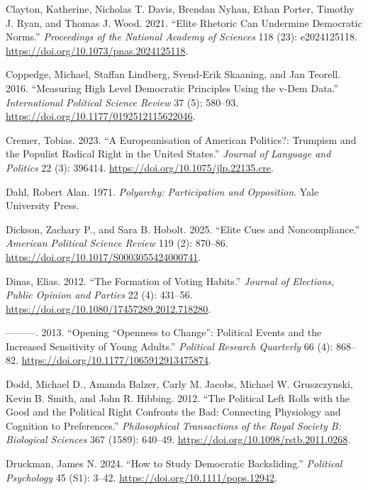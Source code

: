 \documentclass[
  10pt,
  letterpaper,
  DIV=11,
  numbers=noendperiod]{scrartcl}
\newlength{\cslhangindent}
\newenvironment{CSLReferences}[2] %
 {\begin{list}{}{%
  \setlength{\itemindent}{0pt}
  \setlength{\leftmargin}{0pt}
  \setlength{\parsep}{0pt}
  \ifodd #1
   \setlength{\leftmargin}{\cslhangindent}
   \setlength{\itemindent}{-1\cslhangindent}
  \fi
  \setlength{\itemsep}{#2\baselineskip}}}
 {\end{list}}
\begin{document}
\begin{CSLReferences}{1}{0}
Clayton, Katherine, Nicholas T. Davis, Brendan Nyhan, Ethan Porter,
Timothy J. Ryan, and Thomas J. Wood. 2021. {``Elite Rhetoric Can
Undermine Democratic Norms.''} \emph{Proceedings of the National Academy
of Sciences} 118 (23): e2024125118.
\url{https://doi.org/10.1073/pnas.2024125118}.

Coppedge, Michael, Staffan Lindberg, Svend-Erik Skaaning, and Jan
Teorell. 2016. {``Measuring High Level Democratic Principles Using the
v-Dem Data.''} \emph{International Political Science Review} 37 (5):
580--93. \url{https://doi.org/10.1177/0192512115622046}.

Cremer, Tobias. 2023. {``A Europeanisation of American Politics?:
Trumpism and the Populist Radical Right in the United States.''}
\emph{Journal of Language and Politics} 22 (3): 396414.
\url{https://doi.org/10.1075/jlp.22135.cre}.

Dahl, Robert Alan. 1971. \emph{Polyarchy: Participation and Opposition}.
Yale University Press.

Dickson, Zachary P., and Sara B. Hobolt. 2025. {``Elite Cues and
Noncompliance.''} \emph{American Political Science Review} 119 (2):
870--86. \url{https://doi.org/10.1017/S0003055424000741}.

Dinas, Elias. 2012. {``The Formation of Voting Habits.''} \emph{Journal
of Elections, Public Opinion and Parties} 22 (4): 431--56.
\url{https://doi.org/10.1080/17457289.2012.718280}.

---------. 2013. {``Opening {``}Openness to Change{''}: Political Events
and the Increased Sensitivity of Young Adults.''} \emph{Political
Research Quarterly} 66 (4): 868--82.
\url{https://doi.org/10.1177/1065912913475874}.

Dodd, Michael D., Amanda Balzer, Carly M. Jacobs, Michael W.
Gruszczynski, Kevin B. Smith, and John R. Hibbing. 2012. {``The
Political Left Rolls with the Good and the Political Right Confronts the
Bad: Connecting Physiology and Cognition to Preferences.''}
\emph{Philosophical Transactions of the Royal Society B: Biological
Sciences} 367 (1589): 640--49.
\url{https://doi.org/10.1098/rstb.2011.0268}.

Druckman, James N. 2024. {``How to Study Democratic Backsliding.''}
\emph{Political Psychology} 45 (S1): 3--42.
\url{https://doi.org/10.1111/pops.12942}.


\end{CSLReferences}
\end{document}
